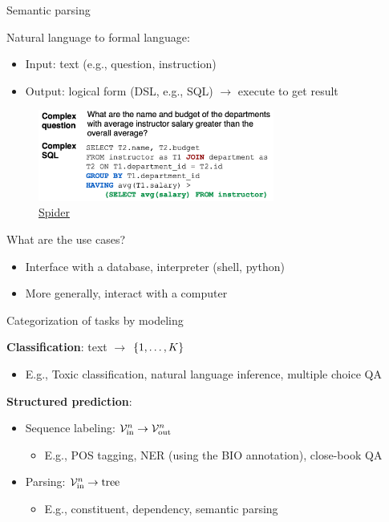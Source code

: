\documentclass[usenames,dvipsnames,notes,11pt,aspectratio=169,hyperref={colorlinks=true, linkcolor=blue}]{beamer}
\begin{document}
\begin{frame}
    {Semantic parsing}

    Natural language to formal language:\\
    \begin{itemize}
        \item Input: text (e.g., question, instruction)
        \item Output: logical form (DSL, e.g., SQL) $\longrightarrow$ execute to get result
    \end{itemize}

    \begin{figure}
        \includegraphics[height=3cm]{figures/text2sql}
        \caption{\href{https://arxiv.org/pdf/1809.08887.pdf}{Spider}}
    \end{figure}

    What are the use cases?\\
    \begin{itemize}
        \item Interface with a database, interpreter (shell, python)
        \item More generally, interact with a computer
    \end{itemize}
\end{frame}

\begin{frame}
    {Categorization of tasks by modeling}

    \textbf{Classification}: text $\rightarrow$ $\left\{ 1,\ldots,K \right\}$\\
    \begin{itemize}
        \item E.g., Toxic classification, natural language inference, multiple choice QA
    \end{itemize}

    \textbf{Structured prediction}: \\
    \begin{itemize}
        \item Sequence labeling: $\mathcal{V}_{\text{in}}^n \rightarrow \mathcal{V}_{\text{out}}^n$
            \begin{itemize}
                \item E.g., POS tagging, NER (using the BIO annotation), close-book QA 
            \end{itemize}
        \item Parsing: $\mathcal{V}_{\text{in}}^n \rightarrow \text{tree}$
                \begin{itemize}
                    \item E.g., constituent, dependency, semantic parsing 
                \end{itemize}
    \end{itemize}
\end{frame}
\end{document}

